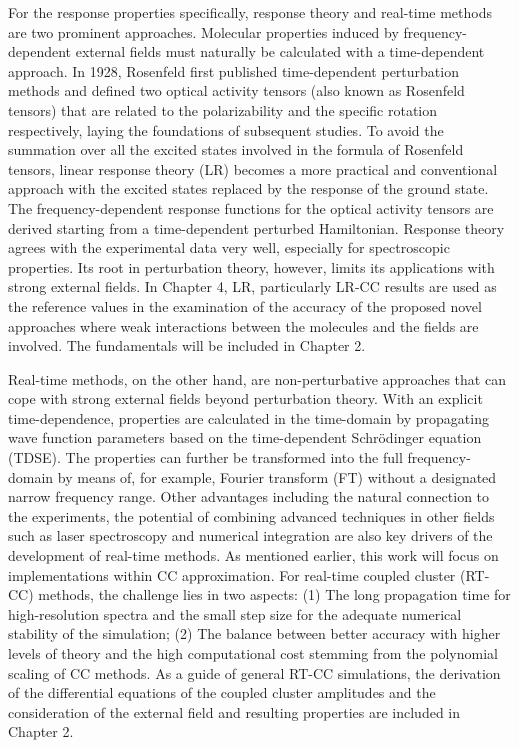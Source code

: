 For the response properties specifically, response theory and real-time methods are two prominent approaches. Molecular properties induced by frequency-dependent external fields must naturally be calculated with a time-dependent approach. In 1928, Rosenfeld first published time-dependent perturbation methods and defined two optical activity tensors (also known as Rosenfeld tensors) that are related to the polarizability and the specific rotation respectively, laying the foundations of subsequent studies.\cite{Rosenfeld1929} To avoid the summation over all the excited states involved in the formula of Rosenfeld tensors, linear response theory (LR)\cite{Olsen1985, Sekino1984} becomes a more practical and conventional approach with the excited states replaced by the response of the ground state. The frequency-dependent response functions for the optical activity tensors are derived starting from a time-dependent perturbed Hamiltonian. Response theory agrees with the experimental data very well, especially for spectroscopic properties.\cite{Kobayashi1994, Roos1996, Coriani2012} Its root in perturbation theory, however, limits its applications with strong external fields. In Chapter 4, LR, particularly LR-CC results are used as the reference values in the examination of the accuracy of the proposed novel approaches where weak interactions between the molecules and the fields are involved. The fundamentals will be included in Chapter 2. 

Real-time methods, on the other hand, are non-perturbative approaches that can cope with strong external fields beyond perturbation theory.\cite{Goings2018, Li2020} With an explicit time-dependence, properties are calculated in the time-domain by propagating wave function parameters based on the time-dependent Schr\"odinger equation (TDSE). The properties can further be transformed into the full frequency-domain by means of, for example, Fourier transform (FT) without a designated narrow frequency range. Other advantages including the natural connection to the experiments, the potential of combining advanced techniques in other fields such as laser spectroscopy and numerical integration are also key drivers of the development of real-time methods. As mentioned earlier, this work will focus on implementations within CC approximation. For real-time coupled cluster (RT-CC) methods, the challenge lies in two aspects: (1) The long propagation time for high-resolution spectra and the small step size for the adequate numerical stability of the simulation; (2) The balance between better accuracy with higher levels of theory and the high computational cost stemming from the polynomial scaling of CC methods. As a guide of general RT-CC simulations, the derivation of the differential equations of the coupled cluster amplitudes and the consideration of the external field and resulting properties are included in Chapter 2. 


